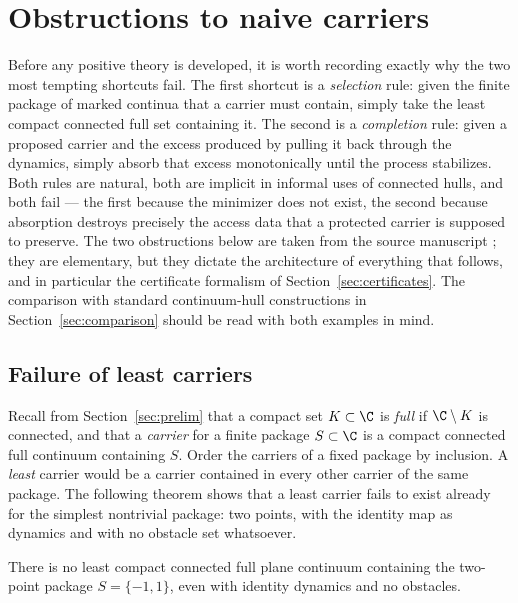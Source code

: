 
\section{Obstructions to naive carriers}\label{sec:obstructions}

Before any positive theory is developed, it is worth recording exactly why the
two most tempting shortcuts fail. The first shortcut is a \emph{selection}
rule: given the finite package of marked continua that a carrier must contain,
simply take the least compact connected full set containing it. The second is
a \emph{completion} rule: given a proposed carrier and the excess produced by
pulling it back through the dynamics, simply absorb that excess monotonically
until the process stabilizes. Both rules are natural, both are implicit in
informal uses of connected hulls, and both fail --- the first because the
minimizer does not exist, the second because absorption destroys precisely the
access data that a protected carrier is supposed to preserve. The two
obstructions below are taken from the source manuscript
\cite[Theorem~6.12, Proposition~6.15]{MWman}; they are elementary, but they
dictate the architecture of everything that follows, and in particular the
certificate formalism of Section~\ref{sec:certificates}. The comparison with
standard continuum-hull constructions in Section~\ref{sec:comparison} should
be read with both examples in mind.

\subsection{Failure of least carriers}\label{subsec:B-no-least}

Recall from Section~\ref{sec:prelim} that a compact set $K\subset\C$ is
\emph{full} if $\C\setminus K$ is connected, and that a \emph{carrier} for a
finite package $S\subset\C$ is a compact connected full continuum containing
$S$. Order the carriers of a fixed package by inclusion. A \emph{least}
carrier would be a carrier contained in every other carrier of the same
package. The following theorem shows that a least carrier fails to exist
already for the simplest nontrivial package: two points, with the identity
map as dynamics and with no obstacle set whatsoever.

\begin{theorem}\label{thm:no-least}
There is no least compact connected full plane continuum containing the
two-point package $S=\{-1,1\}$, even with identity dynamics and no obstacles.
\end{theorem}

